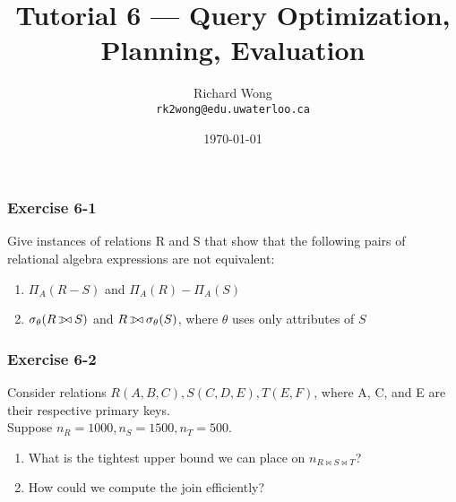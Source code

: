 

\def\ojoin{\setbox0=\hbox{$\bowtie$}%
  \rule[-.02ex]{.25em}{.4pt}\llap{\rule[\ht0]{.25em}{.4pt}}}
\def\leftouterjoin{\mathbin{\ojoin\mkern-5.8mu\bowtie}}

\title{Tutorial 6 --- Query Optimization, Planning, Evaluation }

\author{Richard Wong \\ \small \texttt{rk2wong@edu.uwaterloo.ca}}
\date{\today}




\begin{frame}
  \titlepage

\end{frame}


\begin{frame}
\frametitle{Exercise 6-1}

Give instances of relations R and S that show that the following pairs of relational algebra expressions are not equivalent:

\begin{enumerate}
  \item $\Pi_A(R - S)$ and $\Pi_A(R) - \Pi_A(S)$
  \item $\sigma_{\theta}(R \leftouterjoin S)$ and $R \leftouterjoin \sigma_{\theta}(S)$, where $\theta$ uses only attributes of $S$
\end{enumerate}

\end{frame}


\begin{frame}
\frametitle{Exercise 6-2}

Consider relations $R(A, B, C), S(C, D, E), T(E, F)$, where A, C, and E are their respective primary keys. \\

Suppose $n_R = 1000, n_S = 1500, n_T = 500$.


\begin{enumerate}
  \item What is the tightest upper bound we can place on $n_{ R \bowtie S \bowtie T }$?
  \item How could we compute the join efficiently?
\end{enumerate}


\end{frame}


